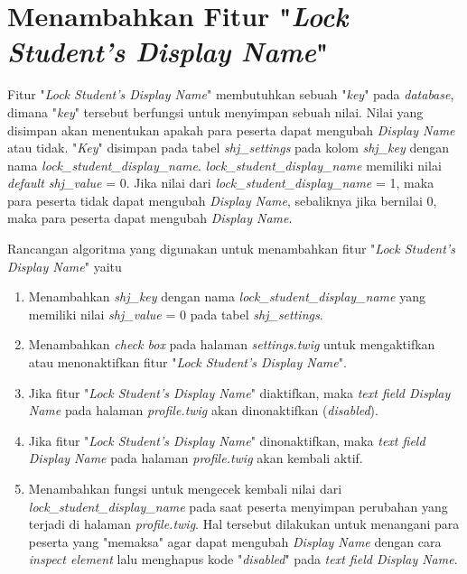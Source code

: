 \section{Menambahkan Fitur "\textit{Lock Student's Display Name}"}
\label{chap:lock}
Fitur "\textit{Lock Student's Display Name}" membutuhkan sebuah "\textit{key}" pada \textit{database}, dimana "\textit{key}" tersebut berfungsi untuk menyimpan sebuah nilai. Nilai yang disimpan akan menentukan apakah para peserta dapat mengubah \textit{Display Name} atau tidak. "\textit{Key}" disimpan pada tabel \textit{shj\_settings} pada kolom \textit{shj\_key} dengan nama \textit{lock\_student\_display\_name}. \textit{lock\_student\_display\_name} memiliki nilai \textit{default shj\_value} = 0. Jika nilai dari \textit{lock\_student\_display\_name} = 1, maka para peserta tidak dapat mengubah \textit{Display Name}, sebaliknya jika bernilai 0, maka para peserta dapat mengubah \textit{Display Name}.

Rancangan algoritma yang digunakan untuk menambahkan fitur "\textit{Lock Student's Display Name}" yaitu
\begin{enumerate}
	\item Menambahkan \textit{shj\_key} dengan nama \textit{lock\_student\_display\_name} yang memiliki nilai \textit{shj\_value} = 0 pada tabel \textit{shj\_settings}.
	\item Menambahkan \textit{check box} pada halaman \textit{settings.twig} untuk mengaktifkan atau menonaktifkan fitur "\textit{Lock Student's Display Name}".
	\item Jika fitur "\textit{Lock Student's Display Name}" diaktifkan, maka \textit{text field Display Name} pada halaman \textit{profile.twig} akan dinonaktifkan (\textit{disabled}).
	\item Jika fitur "\textit{Lock Student's Display Name}" dinonaktifkan, maka \textit{text field Display Name} pada halaman \textit{profile.twig} akan kembali aktif.
	\item Menambahkan fungsi untuk mengecek kembali nilai dari \textit{lock\_student\_display\_name} pada saat peserta menyimpan perubahan yang terjadi di halaman \textit{profile.twig}. Hal tersebut dilakukan untuk menangani para peserta yang "memaksa" agar dapat mengubah \textit{Display Name} dengan cara \textit{inspect element} lalu menghapus kode "\textit{disabled}" pada \textit{text field Display Name}.
\end{enumerate}

